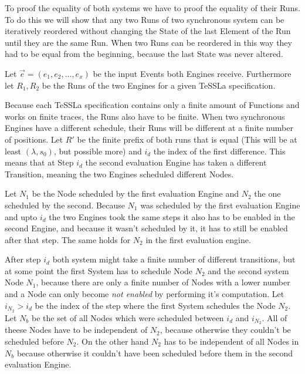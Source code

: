 To proof the equality of both systems we have to proof the equality of their Runs.
To do this we will show that any two Runs of two synchronous system can be iteratively reordered without changing the State of the last Element of the Run until they are the same Run.
When two Runs can be reordered in this way they had to be equal from the beginning, because the last State was never altered.

Let \(\vec{e} = (e_1, e_2, \dots, e_x)\) be the input Events both Engines receive.
Furthermore let \(R_1, R_2\) be the Runs of the two Engines for a given TeSSLa specification.

Because each TeSSLa specification contains only a finite amount of Functions and works on finite traces, the Runs also have to be finite.
When two synchronous Engines have a different schedule, their Runs will be different at a finite number of positions.
Let \(R'\) be the finite prefix of both runs that is equal (This will be at least \((\lambda, s_0)\), but possible more) and \(i_d\) the index of the first difference.
This means that at Step \(i_d\) the second evaluation Engine has taken a different Transition, meaning the two Engines scheduled different Nodes.

Let \(N_1\) be the Node scheduled by the first evaluation Engine and \(N_2\) the one scheduled by the second.
Because \(N_1\) was scheduled by the first evaluation Engine and upto \(i_d\) the two Engines took the same steps it also has to be enabled in the second Engine, and because it wasn't scheduled by it, it has to still be enabled after that step.
The same holds for \(N_2\) in the first evaluation engine.

After step \(i_d\) both system might take a finite number of different transitions, but at some point the first System has to schedule Node \(N_2\) and the second system Node \(N_1\), because there are only a finite number of Nodes with a lower number and a Node can only become \emph{not enabled} by performing it's computation.
Let \(i_{N_2} > i_d\) be the index of the step where the first System schedules the Node \(N_2\).
Let \(N_b\) be the set of all Nodes which were scheduled between \(i_d\) and \(i_{N_2}\).
All of theese Nodes have to be independent of \(N_2\), because otherwise they couldn't be scheduled before \(N_2\). %
On the other hand \(N_2\) has to be independent of all Nodes in \(N_b\) because otherwise it couldn't have been scheduled before them in the second evaluation Engine.

